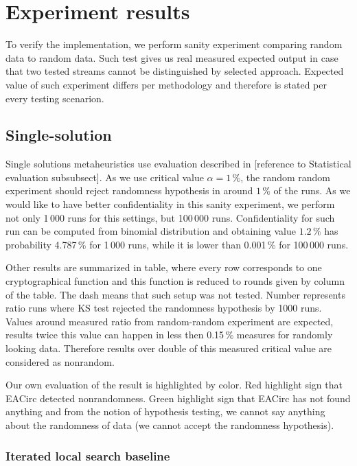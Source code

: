 \documentclass[
  print, %
  Table,   %
  nolof,     %
  nolot,     %
  11pt, %
  oneside  %
]{fithesis3}
\begin{document}
\chapter{Experiment results}

To verify the implementation, we perform sanity experiment comparing random data to random data. Such test gives us real measured expected output in case that two tested streams cannot be distinguished by selected approach. Expected value of such experiment differs per methodology and therefore is stated per every testing scenarion.

\section{Single-solution}


Single solutions metaheuristics use evaluation described in [reference to Statistical evaluation subsubsect]. As we use critical value $\alpha=1\,\%$, the random random experiment should reject randomness hypothesis in around $1\,\%$ of the runs. As we would like to have better confidentiality in this sanity experiment, we perform not only 1\,000 runs for this settings, but 100\,000 runs. Confidentiality for such run can be computed from binomial distribution and obtaining value $1.2\,\%$ has probability 4.787\,\% for 1\,000 runs, while it is lower than 0.001\,\% for 100\,000 runs.

Other results are summarized in table, where every row corresponds to one cryptographical function and this function is reduced to rounds given by column of the table. The dash means that such setup was not tested. Number represents ratio runs where KS test rejected the randomness hypothesis by 1000 runs. Values around measured ratio from random-random experiment are expected, results twice this value can happen in less then 0.15\,\% measures for randomly looking data. Therefore results over double of this measured critical value are considered as nonrandom.

Our own evaluation of the result is highlighted by color. Red highlight sign that EACirc detected nonrandomness. Green highlight sign that EACirc has not found anything and from the notion of hypothesis testing, we cannot say anything about the randomness of data (we cannot accept the randomness hypothesis).

\subsection{Iterated local search baseline}
\end{document}

